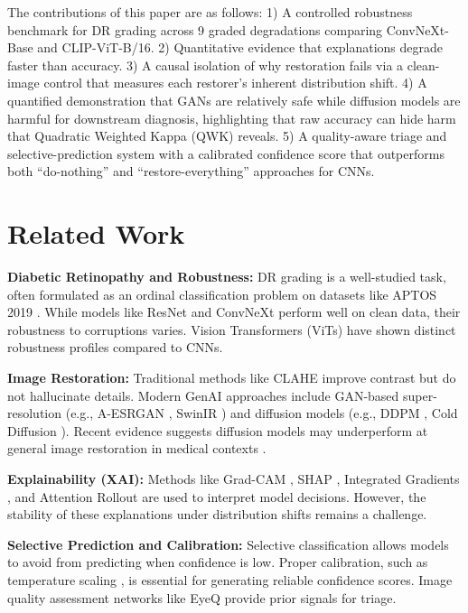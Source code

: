 \documentclass[runningheads]{llncs}
\begin{document}
The contributions of this paper are as follows:
1) A controlled robustness benchmark for DR grading across 9 graded degradations comparing ConvNeXt-Base and CLIP-ViT-B/16.
2) Quantitative evidence that explanations degrade faster than accuracy.
3) A causal isolation of why restoration fails via a clean-image control that measures each restorer's inherent distribution shift.
4) A quantified demonstration that GANs are relatively safe while diffusion models are harmful for downstream diagnosis, highlighting that raw accuracy can hide harm that Quadratic Weighted Kappa (QWK) reveals.
5) A quality-aware triage and selective-prediction system with a calibrated confidence score that outperforms both ``do-nothing'' and ``restore-everything'' approaches for CNNs.

\section{Related Work}
\textbf{Diabetic Retinopathy and Robustness:} DR grading is a well-studied task, often formulated as an ordinal classification problem on datasets like APTOS 2019 \cite{aptos2019}. While models like ResNet \cite{he2016resnet} and ConvNeXt \cite{liu2022convnext} perform well on clean data, their robustness to corruptions varies. Vision Transformers (ViTs) \cite{dosovitskiy2021vit, radford2021clip} have shown distinct robustness profiles compared to CNNs.

\textbf{Image Restoration:} Traditional methods like CLAHE \cite{pizer1987clahe} improve contrast but do not hallucinate details. Modern GenAI approaches include GAN-based super-resolution (e.g., A-ESRGAN \cite{wei2021aesrgan}, SwinIR \cite{liang2021swinir}) and diffusion models (e.g., DDPM \cite{ho2020ddpm}, Cold Diffusion \cite{bansal2022colddiffusion}). Recent evidence suggests diffusion models may underperform at general image restoration in medical contexts \cite{arxiv241209324}.

\textbf{Explainability (XAI):} Methods like Grad-CAM \cite{selvaraju2017gradcam}, SHAP \cite{lundberg2017shap}, Integrated Gradients \cite{sundararajan2017ig}, and Attention Rollout \cite{abnar2020rollout} are used to interpret model decisions. However, the stability of these explanations under distribution shifts remains a challenge.

\textbf{Selective Prediction and Calibration:} Selective classification \cite{geifman2017selective} allows models to avoid from predicting when confidence is low. Proper calibration, such as temperature scaling \cite{guo2017calibration}, is essential for generating reliable confidence scores. Image quality assessment networks like EyeQ \cite{fu2019eyeq} provide prior signals for triage.
\end{document}
